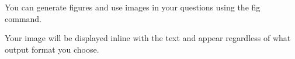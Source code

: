 \documentclass[12pt]{exam}
\begin{document}
\begin{questions}
                You can generate figures and use images in your questions using the fig command.
                \begin{comment} pyxam!fig

import matplotlib.pyplot as plt
plt.plot([1,2,3,4])
plt.ylabel('Y axis')
plt.xlabel('X axis')
plt.title('A Simple Graph')
plt.show()

                \end{comment}
                Your image will be displayed inline with the text and appear regardless of what output format you choose.


        \end{questions}



    
\end{document}
